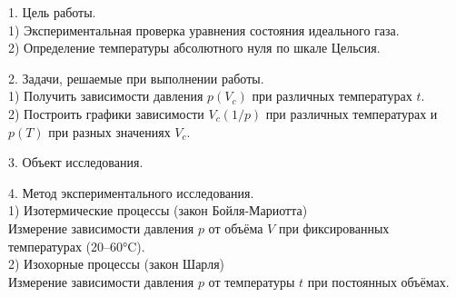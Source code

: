 \documentclass[12pt]{article}
\begin{document}
\noindent\makebox[\linewidth]{\rule{\textwidth}{1pt}}
\noindent\makebox[\linewidth]{\rule{\textwidth}{1pt}}

\begin{flushleft}
    1. Цель работы.\\
    \hspace{0.63cm}1) Экспериментальная проверка уравнения состояния идеального газа. \\
    \hspace{0.63cm}2) Определение температуры абсолютного нуля по шкале Цельсия. \\
\end{flushleft}

\begin{flushleft}
    2. Задачи, решаемые при выполнении работы.\\
    \hspace{0.63cm}1) Получить зависимости давления $p(V_c)$ при различных температурах $t$. \\
    \hspace{0.63cm}2) Построить графики зависимости $V_c(1/p)$ при различных
    температурах и $p(T)$ при разных значениях $V_c$. \\
\end{flushleft}

\begin{flushleft}
    3. Объект исследования. \\
\end{flushleft}

\begin{flushleft}
    4. Метод экспериментального исследования. \\
    \hspace{0.63cm}1) Изотермические процессы (закон Бойля-Мариотта) \\
    Измерение зависимости давления $p$ от объёма $V$ при фиксированных
    температурах (20–60°C). \\
    \hspace{0.63cm}2) Изохорные процессы (закон Шарля) \\
    Измерение зависимости давления $p$ от температуры $t$ при постоянных объёмах.

\end{flushleft}
\end{document}
